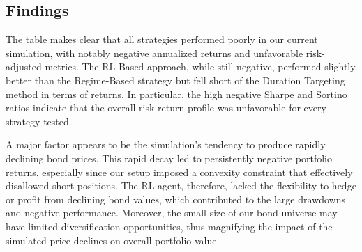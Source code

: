 \documentclass[
  a4paper,
  10pt,
  unnumberedsections,
  twoside,
]{LTJournalArticle}
\begin{document}
\begin{table*}[ht]
  \centering
  \caption{Strategy Comparison in the Simulated Fixed Income Environment}
  \label{tab:strategy_comparison}
  \end{table*}
  
\subsection{Findings}

The table makes clear that all strategies performed poorly in our current simulation, with notably negative annualized returns and unfavorable risk-adjusted metrics. The RL-Based approach, while still negative, performed slightly better than the Regime-Based strategy but fell short of the Duration Targeting method in terms of returns. In particular, the high negative Sharpe and Sortino ratios indicate that the overall risk-return profile was unfavorable for every strategy tested.

A major factor appears to be the simulation’s tendency to produce rapidly declining bond prices. This rapid decay led to persistently negative portfolio returns, especially since our setup imposed a convexity constraint that effectively disallowed short positions. The RL agent, therefore, lacked the flexibility to hedge or profit from declining bond values, which contributed to the large drawdowns and negative performance. Moreover, the small size of our bond universe may have limited diversification opportunities, thus magnifying the impact of the simulated price declines on overall portfolio value.
\end{document}
